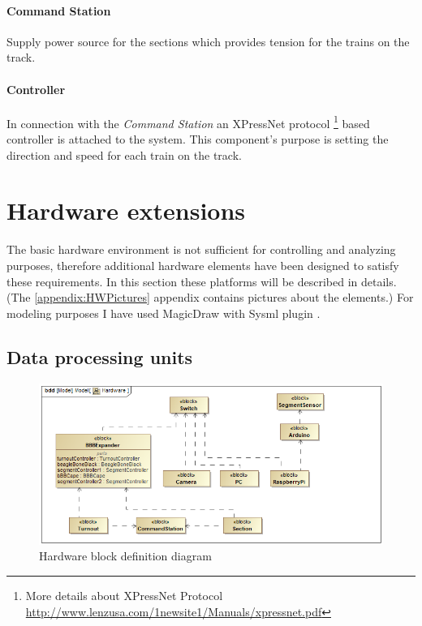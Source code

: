 \paragraph{Command Station} \label{basics:CS}
Supply power source for the sections which provides tension for the trains on the track.

\paragraph{Controller}
In connection with the \textit{Command Station} an XPressNet protocol \footnote{More details about XPressNet Protocol \url{http://www.lenzusa.com/1newsite1/Manuals/xpressnet.pdf}} based controller is attached to the system. This component's purpose is setting the direction and speed for each train on the track.

\section{Hardware extensions}
The basic hardware environment is not sufficient for controlling and analyzing purposes, therefore additional hardware elements have been designed to satisfy these requirements. In this section these platforms will be described in details. (The \ref{appendix:HWPictures} appendix contains pictures about the elements.)
For modeling purposes I have used MagicDraw with Sysml plugin \cite{SysML}.

\subsection{Data processing units}
\begin{figure}[h]
	\centering
	\includegraphics[width=150mm]{figures/modes3/Hardware.png}
	\caption{Hardware block definition diagram}
	\label{fig:Modes3HWBDD}
\end{figure}


